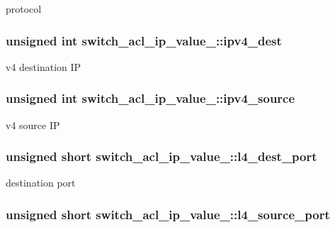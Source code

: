 protocol \hypertarget{unionswitch__acl__ip__value___a674522d0fc324f1e079f70ce37eac1fb}{
\subsubsection[{ipv4\+\_\+dest}]{\setlength{\rightskip}{0pt plus 5cm}unsigned int switch\+\_\+acl\+\_\+ip\+\_\+value\+\_\+\+::ipv4\+\_\+dest}}\label{unionswitch__acl__ip__value___a674522d0fc324f1e079f70ce37eac1fb}
v4 destination I\+P \hypertarget{unionswitch__acl__ip__value___ac657286d9079c7286ebb71ee289d7ab3}{
\subsubsection[{ipv4\+\_\+source}]{\setlength{\rightskip}{0pt plus 5cm}unsigned int switch\+\_\+acl\+\_\+ip\+\_\+value\+\_\+\+::ipv4\+\_\+source}}\label{unionswitch__acl__ip__value___ac657286d9079c7286ebb71ee289d7ab3}
v4 source I\+P \hypertarget{unionswitch__acl__ip__value___a0268da45a9c739a38f8445dd32a70a88}{
\subsubsection[{l4\+\_\+dest\+\_\+port}]{\setlength{\rightskip}{0pt plus 5cm}unsigned short switch\+\_\+acl\+\_\+ip\+\_\+value\+\_\+\+::l4\+\_\+dest\+\_\+port}}\label{unionswitch__acl__ip__value___a0268da45a9c739a38f8445dd32a70a88}
destination port \hypertarget{unionswitch__acl__ip__value___aaa5556a5b1d57fdcfb9f77925f625aa3}{
\subsubsection[{l4\+\_\+source\+\_\+port}]{\setlength{\rightskip}{0pt plus 5cm}unsigned short switch\+\_\+acl\+\_\+ip\+\_\+value\+\_\+\+::l4\+\_\+source\+\_\+port}}\label{unionswitch__acl__ip__value___aaa5556a5b1d57fdcfb9f77925f625aa3}
